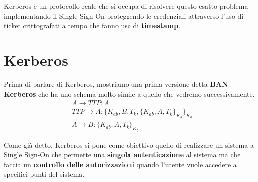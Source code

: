 Kerberos è un protocollo reale che si occupa di risolvere questo esatto problema implementando il Single Sign-On proteggendo le credenziali attraverso l'uso di ticket crittografati a tempo che fanno uso di \textbf{timestamp}. 

\section{Kerberos}
Prima di parlare di Kerberos, mostriamo una prima versione detta \textbf{BAN Kerberos} che ha uno schema molto simile a quello che vedremo successivamente.
\begin{align}
    &A \rightarrow TTP : A\\
    &TTP \rightarrow A : \{K_{ab}, B, T_k, \{K_{ab},A, T_k\}_{K_b}\}_{K_a}\\
    &A \rightarrow B : \{K_{ab}, A, T_k\}_{K_b}
\end{align}

Come già detto, Kerberos si pone come obiettivo quello di realizzare un sistema a Single Sign-On che permette una \textbf{singola autenticazione} al sistema ma che faccia un \textbf{controllo delle autorizzazioni} quando l'utente vuole accedere a specifici punti del sistema.  


